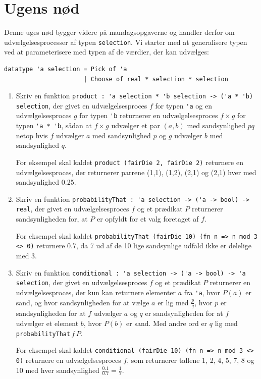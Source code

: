 \documentclass[a4paper,12pt]{article}
\begin{document}
\section{Ugens nød}
\label{sec:ugens-nod}

Denne uges nød bygger videre på mandagsopgaverne og handler derfor om
udvælgelsesprocesser af typen \lstinline{selection}.  Vi starter med
at generalisere typen ved at parameterisere med typen af de værdier,
der kan udvælges:


\begin{lstlisting}
datatype 'a selection = Pick of 'a
                      | Choose of real * selection * selection
\end{lstlisting}


\begin{enumerate}[{5N}1]
\item Skriv en funktion
\lstinline{product : 'a selection * 'b selection -> ('a * 'b) selection},
der givet en udvælgelsesproces $f$ for typen \lstinline{'a} og en
udvælgelsesproces $g$ for typen \lstinline{'b} returnerer en
udvælgelsesproces $f\times g$ for typen \lstinline{'a * 'b}, sådan at
$f\times g$ udvælger et par $(a,b)$ med sandsynlighed $pq$ netop hvis
$f$ udvælger $a$ med sandsynlighed $p$ og $g$ udvælger $b$ med
sandsynlighed $q$.

For eksempel skal kaldet \lstinline{product (fairDie 2, fairDie 2)}
returnere en udvælgelsesproces, der returnerer parrene (1,1), (1,2),
(2,1) og (2,1) hver med sandsynlighed 0.25.

\item Skriv en funktion
\lstinline{probabilityThat : 'a selection -> ('a -> bool) -> real},
der givet en udvælgelsesproces $f$ og et prædikat $P$ returnerer
sandsynligheden for, at $P$ er opfyldt for et valg foretaget af $f$.

For eksempel skal kaldet
\lstinline{probabilityThat (fairDie 10) (fn n => n mod 3 <> 0)} returnere
0.7, da 7 ud af de 10 lige sandsynlige udfald ikke er delelige med 3.

\item Skriv en funktion
\lstinline{conditional : 'a selection -> ('a -> bool) -> 'a selection},
der givet en udvælgelsesproces $f$ og et prædikat $P$ returnerer
en udvælgelsesproces, der kun kan returnere elementer $a$ fra
\lstinline{'a}, hvor $P(a)$ er sand, og hvor sandsynligheden for at
vælge $a$ er lig med $\frac{p}{q}$, hvor $p$ er sandsynligheden for at
$f$ udvælger $a$ og $q$ er sandsynligheden for at $f$ udvælger et
element $b$, hvor $P(b)$ er sand.  Med andre ord er $q$ lig
med \lstinline{probabilityThat}\,$f$\,$P$.

For eksempel skal kaldet
\lstinline{conditional (fairDie 10) (fn n => n mod 3 <> 0)} returnere en
udvælgelsesproces $f$, som returnerer tallene 1, 2, 4, 5, 7, 8 og 10
med hver sandsynlighed $\frac{0.1}{0.7} = \frac{1}{7}$.

\end{enumerate}
\end{document}
